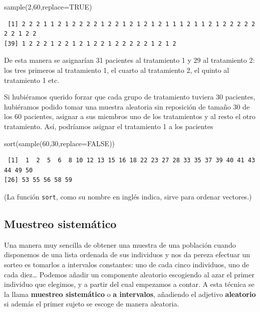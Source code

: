 \documentclass[
  spanish,
  letterpaper,
  DIV=11,
  numbers=noendperiod]{scrreprt}
\newenvironment{Shaded}{\begin{snugshade}}{\end{snugshade}}
\newcommand{\AttributeTok}[1]{\textcolor[rgb]{0.40,0.45,0.13}{#1}}
\newcommand{\ConstantTok}[1]{\textcolor[rgb]{0.56,0.35,0.01}{#1}}
\newcommand{\DecValTok}[1]{\textcolor[rgb]{0.68,0.00,0.00}{#1}}
\newcommand{\FunctionTok}[1]{\textcolor[rgb]{0.28,0.35,0.67}{#1}}
\newcommand{\NormalTok}[1]{\textcolor[rgb]{0.00,0.23,0.31}{#1}}
\begin{document}
\begin{Shaded}
\begin{Highlighting}[]
\FunctionTok{sample}\NormalTok{(}\DecValTok{2}\NormalTok{,}\DecValTok{60}\NormalTok{,}\AttributeTok{replace=}\ConstantTok{TRUE}\NormalTok{)}
\end{Highlighting}
\end{Shaded}

\begin{verbatim}
 [1] 2 2 2 1 1 2 1 2 2 2 2 1 2 2 1 2 1 2 1 2 1 1 1 2 1 1 2 1 2 2 2 2 2 2 2 1 2 2
[39] 1 2 2 2 1 2 2 1 2 1 2 2 1 2 2 2 2 2 1 2 1 2
\end{verbatim}

De esta manera se asignarían 31 pacientes al tratamiento 1 y 29 al
tratamiento 2: los tres primeros al tratamiento 1, el cuarto al
tratamiento 2, el quinto al tratamiento 1 etc.

Si hubiéramos querido forzar que cada grupo de tratamiento tuviera 30
pacientes, hubiéramos podido tomar una muestra aleatoria sin reposición
de tamaño 30 de los 60 pacientes, asignar a sus miembros uno de los
tratamientos y al resto el otro tratamiento. Así, podríamos asignar el
tratamiento 1 a los pacientes

\begin{Shaded}
\begin{Highlighting}[]
\FunctionTok{sort}\NormalTok{(}\FunctionTok{sample}\NormalTok{(}\DecValTok{60}\NormalTok{,}\DecValTok{30}\NormalTok{,}\AttributeTok{replace=}\ConstantTok{FALSE}\NormalTok{))}
\end{Highlighting}
\end{Shaded}

\begin{verbatim}
 [1]  1  2  5  6  8 10 12 13 15 16 18 22 23 27 28 33 35 37 39 40 41 43 44 49 50
[26] 53 55 56 58 59
\end{verbatim}

(La función \texttt{sort}, como su nombre en inglés indica, sirve para
ordenar vectores.)

\subsection{Muestreo sistemático}\label{muestreo-sistemuxe1tico}

Una manera muy sencilla de obtener una muestra de una población cuando
disponemos de una lista ordenada de sus individuos y nos da pereza
efectuar un sorteo es tomarlos a intervalos constantes: uno de cada
cinco individuos, uno de cada diez\ldots{} Podemos añadir un componente
aleatorio escogiendo al azar el primer individuo que elegimos, y a
partir del cual empezamos a contar. A esta técnica se la llama
\textbf{muestreo sistemático} o \textbf{a intervalos}, añadiendo el
adjetivo \textbf{aleatorio} si además el primer sujeto se escoge de
manera aleatoria.
\end{document}

